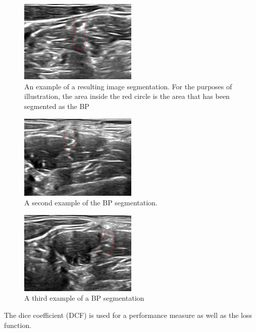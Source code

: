 \documentclass[letterpaper]{article}
\begin{document}
 \begin{figure}[H]
  \centerline{\includegraphics[width=0.5\textwidth]{Images/SegmentExample1.png}}
  \caption{An example of a resulting image segmentation. For the purposes of illustration, the area inside the red circle is the area that has been segmented as the BP}
  \label{fig:BPSegmentation1}
\end{figure}

 \begin{figure}[H]
  \centerline{\includegraphics[width=0.5\textwidth]{Images/SegmentExample2.png}}
  \caption{A second example of the BP segmentation.}
  \label{fig:BPSegmentation2}
\end{figure}

 \begin{figure}[H]
  \centerline{\includegraphics[width=0.5\textwidth]{Images/SegmentExample3.png}}
  \caption{A third example of a BP segmentation}
  \label{fig:BPSegmentation3}
\end{figure}

The dice coefficient (DCF) is used for a performance measure as well as the loss function. 
\end{document}
